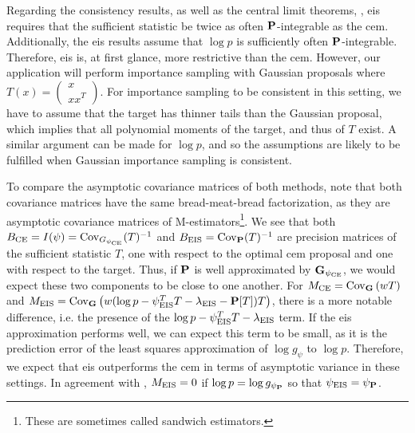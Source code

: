 Regarding the consistency results,  as well as the central limit theorems, , \acrshort{eis} requires that the sufficient statistic be twice as often $\P$-integrable as the \acrshort{cem}. Additionally, the \acrshort{eis} results assume that $\log p$ is sufficiently often $\P$-integrable. Therefore, \acrshort{eis} is, at first glance, more restrictive than the \acrshort{cem}. However, our application will perform importance sampling with Gaussian proposals where $T(x) = \begin{pmatrix} x \\ xx^{T}\end{pmatrix}$. For importance sampling to be consistent in this setting, we have to assume that the target has thinner tails than the Gaussian proposal, which implies that all polynomial moments of the target, and thus of $T$ exist. A similar argument can be made for $\log p$, and so the assumptions are likely to be fulfilled when Gaussian importance sampling is consistent.

To compare the asymptotic covariance matrices of both methods, note that both covariance matrices have the same \glqq{}bread-meat-bread\grqq{} factorization, as they are asymptotic covariance matrices of M-estimators\footnote{These are sometimes called sandwich estimators.}. We see that both $B_{\ce} = I(\psi) = \cov_{G_{\pce}}(T)^{-1}$ and $B_{\eis} = \cov_{\P}(T)^{-1}$ are precision matrices of the sufficient statistic $T$, one with respect to the optimal \acrshort{cem} proposal and one with respect to the target. Thus, if $\P$ is well approximated by $\G_{\pce}$, we would expect these two components to be close to one another. 
For $M_{\ce} = \cov_{\G} \left( w T \right)$ and $M_{\eis} = \cov_{\G}\left( w (\log p - \psi_{\eis}^{T}T - \lambda_{\eis} - \P [T])T \right)$, there is a more notable difference, i.e. the presence of the $\log p - \psi_{\eis}^TT-\lambda_{\eis}$ term. If the \acrshort{eis} approximation performs well, we can expect this term to be small, as it is the prediction error of the least squares approximation of $\log g_{\psi}$ to $\log p$. Therefore, we expect that \acrshort{eis} outperforms the \acrshort{cem} in terms of asymptotic variance in these settings. In agreement with , $M_{\eis} = 0$ if $\log p = \log g_{\psi_{\P}}$ so that $\peis = \psi_{\P}$.

